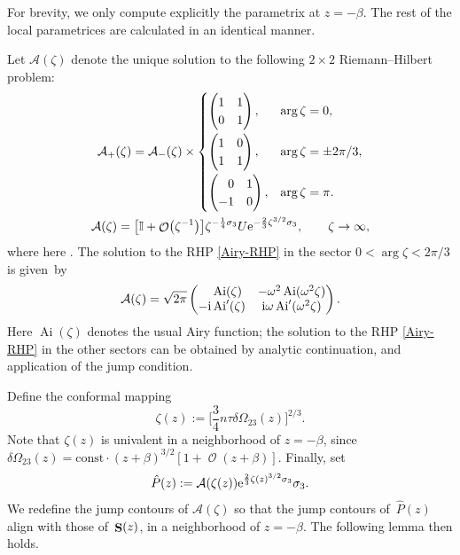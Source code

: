 \documentclass[pdftex]{sigma}
\DeclareMathOperator{\OO}{\mathcal{O}}
\DeclareMathOperator{\Ai}{Ai}
\DeclareMathOperator{\boldS}{{\bf S}}
\numberwithin{equation}{section}
\begin{document}
For brevity, we only compute explicitly the parametrix at $z=-\beta$. The rest of the local parametrices are calculated in an identical manner.

Let $\mathcal{A}(\zeta)$ denote the unique solution to the following $2\times 2$ Riemann--Hilbert problem:
 \begin{gather}
 \mathcal{A}_+(\zeta) = \mathcal{A}_-(\zeta)\times
 \begin{cases}
 \begin{pmatrix}1 & 1\\ 0 & 1\end{pmatrix}, & \arg \zeta = 0,\vspace{1mm}\\
 \begin{pmatrix}1 & 0\\ 1 & 1\end{pmatrix}, & \arg \zeta = \pm 2\pi/3,\vspace{1mm}\\
 \begin{pmatrix}\hphantom{-}0 & 1\\ -1 & 0\end{pmatrix}, & \arg \zeta = \pi.
 \end{cases}\nonumber\\
 \mathcal{A}(\zeta) = \bigl[\mathbb{I} + \OO\bigl(\zeta^{-1}\bigr)\bigr]\zeta^{-\frac{1}{4}\sigma_3} U {\rm e}^{-\frac{2}{3}\zeta^{3/2}\sigma_3}, \qquad \zeta\to \infty,\label{Airy-RHP}
 \end{gather}
where here . The solution to the RHP \eqref{Airy-RHP} in the sector
$0 < \arg \zeta < 2\pi/3$ is given~by
 \begin{equation*}
 \mathcal{A}(\zeta) = \sqrt{2\pi}
 \begin{pmatrix}
 \hphantom{-}\Ai(\zeta) &-\omega^2 \Ai(\omega^2\zeta)\\
 -{\rm i}\Ai'(\zeta)& {\rm i}\omega \Ai'(\omega^2\zeta)
 \end{pmatrix}.
 \end{equation*}
Here $\Ai(\zeta)$ denotes the usual Airy function; the solution to the RHP \eqref{Airy-RHP} in the other sectors can be obtained by analytic continuation, and
application of the jump condition.

Define the conformal mapping
 \begin{equation*}
 \zeta(z) := \biggl[\frac{3}{4}n\tau \delta\Omega_{23}(z)\biggr]^{2/3}.
 \end{equation*}
Note that $\zeta(z)$ is univalent in a neighborhood of $z=-\beta$, since $\delta\Omega_{23}(z) = \text{const}\cdot (z+\beta)^{3/2}[1+ \OO(z+\beta)]$.
Finally, set
 \begin{equation*}
 \hat{P}(z) := \mathcal{A}(\zeta(z)) {\rm e}^{\frac{2}{3}\zeta(z)^{3/2}\sigma_3}\sigma_3.
 \end{equation*}
We redefine the jump contours of $\mathcal{A}(\zeta)$ so that the jump contours of~$\hat{P}(z)$ align with those of~$\boldS(z)$, in a neighborhood of $z=-\beta$.
The following lemma then holds.
\end{document}
